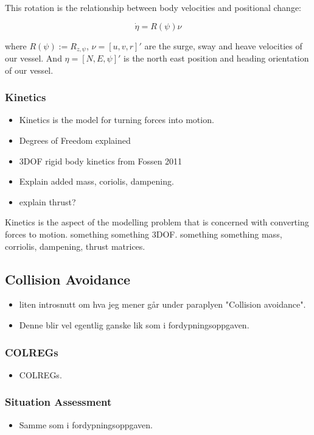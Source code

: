 This rotation is the relationship between body velocities and positional change:

\begin{equation}
    \label{eq:eta dot}
    \dot{\eta} = R(\psi) \nu
\end{equation}

where $R(\psi) := R_{z,\psi}$, $\nu = [u,v,r]'$ are the surge, sway and heave velocities of our vessel. And $\eta = [N, E, \psi]'$ is the north east position and heading orientation of our vessel.

\subsubsection{Kinetics}
\begin{itemize}
    \item Kinetics is the model for turning forces into motion.
    \item Degrees of Freedom explained
    \item 3DOF rigid body kinetics from Fossen 2011
    \item Explain added mass, coriolis, dampening.
    \item explain thrust?
\end{itemize}
Kinetics is the aspect of the modelling problem that is concerned with converting forces to motion.
something something 3DOF. something something mass, corriolis, dampening, thrust matrices.



\subsection{Collision Avoidance}
\begin{itemize}
    \item liten introsnutt om hva jeg mener går under paraplyen "Collision avoidance".
    \item Denne blir vel egentlig ganske lik som i fordypningsoppgaven.
\end{itemize}

\subsubsection{COLREGs}
\begin{itemize}
    \item COLREGs.
\end{itemize}

\subsubsection{Situation Assessment}
\begin{itemize}
    \item Samme som i fordypningsoppgaven.
\end{itemize}

